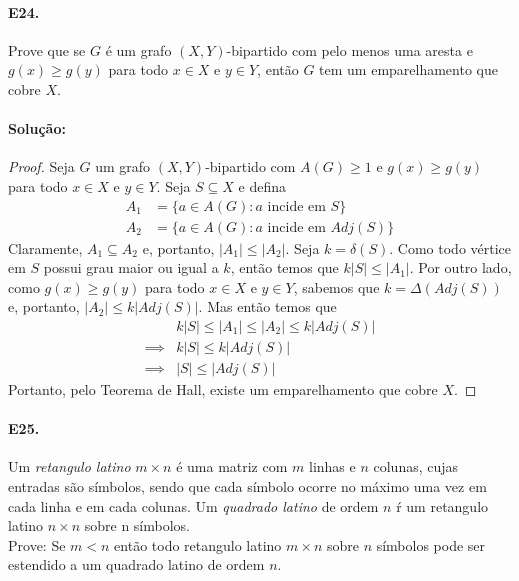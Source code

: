 \documentclass[11pt,a4paper,notitlepage]{exam}
\begin{document}
    \paragraph*{E24. }Prove que se $G$ é um grafo
    $(X,Y)$-bipartido com pelo menos uma aresta e $g(x)\geq g(y)$
    para todo $x\in X$ e $y\in Y$, então $G$ tem um
    emparelhamento que cobre $X$.
    \paragraph*{Solução:}
    \begin{proof}
        Seja $G$ um grafo $(X, Y)$-bipartido com $A(G)\geq 1$ e $g(x)\geq g(y)$
    para todo $x\in X$ e $y\in Y$. Seja $S\subseteq X$ e defina
        \begin{align*}
            A_1 &= \{a \in A(G): a \text{ incide em } S\}\\
            A_2 &= \{a \in A(G): a \text{ incide em } Adj(S)\}
        \end{align*}
    Claramente, $A_1 \subseteq A_2$ e, portanto, $|A_1| \leq |A_2|$.
    Seja $k = \delta(S)$. Como todo vértice em $S$ possui grau maior
     ou igual a $k$, então temos que $k|S| \leq |A_1|$. Por
     outro lado, como $g(x)\geq g(y)$
    para todo $x\in X$ e $y\in Y$, sabemos que $k =
    \Delta(Adj(S))$ e, portanto, $|A_2|\leq k|Adj(S)|$. Mas então
    temos que 
    \begin{align*}
        & k|S| \leq |A_1| \leq |A_2| \leq k|Adj(S)|\\
        \implies & k|S| \leq k|Adj(S)|\\
        \implies & |S| \leq |Adj(S)|
    \end{align*}
    Portanto, pelo Teorema de Hall, existe um emparelhamento que
    cobre $X$.
    \end{proof}
\paragraph*{E25. } Um \textit{retangulo latino} $m\times n$ é uma
matriz com $m$ linhas e $n$ colunas, cujas entradas são símbolos,
sendo que cada símbolo ocorre no máximo uma vez em cada linha e em cada
colunas. Um \textit{quadrado latino} de ordem $n$ ŕ um retangulo
latino $n\times n$ sobre n símbolos.\medskip\\
Prove: Se $m < n$ então todo retangulo latino $m\times n$ sobre $n$
símbolos pode ser estendido a um quadrado latino de ordem $n$.
\end{document}
